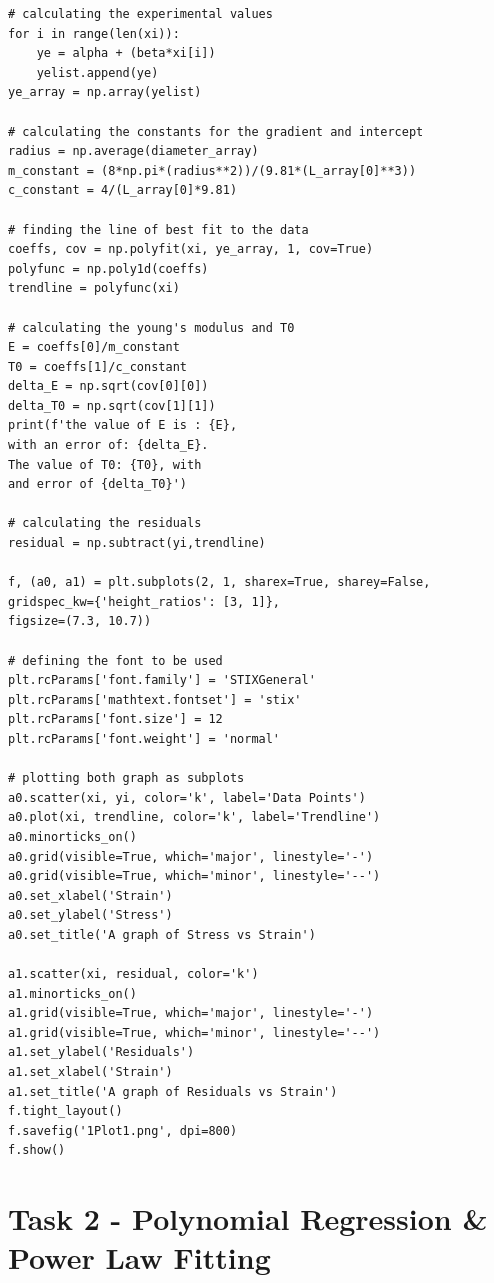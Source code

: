 \documentclass[12pt, a4paper]{article}
\begin{document}
\begin{verbatim}
# calculating the experimental values 
for i in range(len(xi)):
    ye = alpha + (beta*xi[i])
    yelist.append(ye)
ye_array = np.array(yelist)

# calculating the constants for the gradient and intercept
radius = np.average(diameter_array)
m_constant = (8*np.pi*(radius**2))/(9.81*(L_array[0]**3))
c_constant = 4/(L_array[0]*9.81)

# finding the line of best fit to the data
coeffs, cov = np.polyfit(xi, ye_array, 1, cov=True)
polyfunc = np.poly1d(coeffs)
trendline = polyfunc(xi)

# calculating the young's modulus and T0
E = coeffs[0]/m_constant
T0 = coeffs[1]/c_constant
delta_E = np.sqrt(cov[0][0])
delta_T0 = np.sqrt(cov[1][1])
print(f'the value of E is : {E}, 
with an error of: {delta_E}. 
The value of T0: {T0}, with 
and error of {delta_T0}')

# calculating the residuals
residual = np.subtract(yi,trendline)

f, (a0, a1) = plt.subplots(2, 1, sharex=True, sharey=False, 
gridspec_kw={'height_ratios': [3, 1]}, 
figsize=(7.3, 10.7))

# defining the font to be used
plt.rcParams['font.family'] = 'STIXGeneral'
plt.rcParams['mathtext.fontset'] = 'stix'
plt.rcParams['font.size'] = 12
plt.rcParams['font.weight'] = 'normal'

# plotting both graph as subplots
a0.scatter(xi, yi, color='k', label='Data Points')
a0.plot(xi, trendline, color='k', label='Trendline')
a0.minorticks_on()
a0.grid(visible=True, which='major', linestyle='-')
a0.grid(visible=True, which='minor', linestyle='--')
a0.set_xlabel('Strain')
a0.set_ylabel('Stress')
a0.set_title('A graph of Stress vs Strain')

a1.scatter(xi, residual, color='k')
a1.minorticks_on()
a1.grid(visible=True, which='major', linestyle='-')
a1.grid(visible=True, which='minor', linestyle='--')
a1.set_ylabel('Residuals')
a1.set_xlabel('Strain')
a1.set_title('A graph of Residuals vs Strain')
f.tight_layout()
f.savefig('1Plot1.png', dpi=800)
f.show()

\end{verbatim}
\newpage

\section{Task 2 -  Polynomial Regression \& Power Law Fitting}
\end{document}
